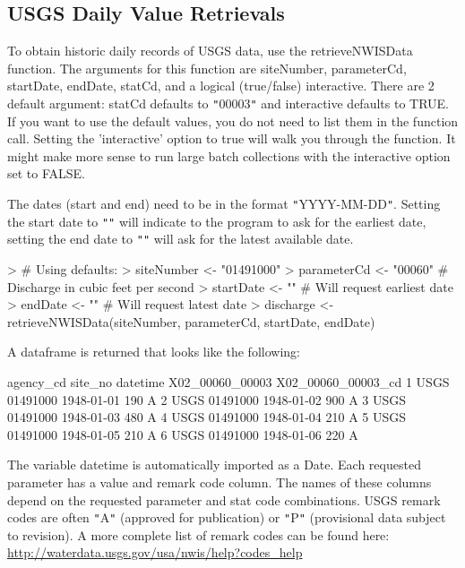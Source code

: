 \documentclass[a4paper,11pt]{article}
\begin{document}
\subsection{USGS Daily Value Retrievals}
\label{sec:usgsDaily}
To obtain historic daily records of USGS data, use the retrieveNWISData function. The arguments for this function are siteNumber, parameterCd, startDate, endDate, statCd, and a logical (true/false) interactive. There are 2 default argument: statCd defaults to \texttt{"}00003\texttt{"} and interactive defaults to TRUE.  If you want to use the default values, you do not need to list them in the function call. Setting the 'interactive' option to true will walk you through the function. It might make more sense to run large batch collections with the interactive option set to FALSE. 

The dates (start and end) need to be in the format \texttt{"}YYYY-MM-DD\texttt{"}.  Setting the start date to \texttt{"}\texttt{"} will indicate to the program to ask for the earliest date, setting the end date to \texttt{"}\texttt{"} will ask for the latest available date.

\begin{Schunk}
\begin{Sinput}
> # Using defaults:
> siteNumber <- "01491000"
> parameterCd <- "00060"  # Discharge in cubic feet per second
> startDate <- ""  # Will request earliest date
> endDate <- "" # Will request latest date
> discharge <- retrieveNWISData(siteNumber, parameterCd, startDate, endDate)
\end{Sinput}
\end{Schunk}

A dataframe is returned that looks like the following:
\begin{Schunk}
\begin{Soutput}
  agency_cd  site_no   datetime X02_00060_00003 X02_00060_00003_cd
1      USGS 01491000 1948-01-01             190                  A
2      USGS 01491000 1948-01-02             900                  A
3      USGS 01491000 1948-01-03             480                  A
4      USGS 01491000 1948-01-04             210                  A
5      USGS 01491000 1948-01-05             210                  A
6      USGS 01491000 1948-01-06             220                  A
\end{Soutput}
\end{Schunk}

The variable datetime is automatically imported as a Date. Each requested parameter has a value and remark code column.  The names of these columns depend on the requested parameter and stat code combinations. USGS remark codes are often \texttt{"}A\texttt{"} (approved for publication) or \texttt{"}P\texttt{"} (provisional data subject to revision). A more complete list of remark codes can be found here:
\url{http://waterdata.usgs.gov/usa/nwis/help?codes_help}
\end{document}
